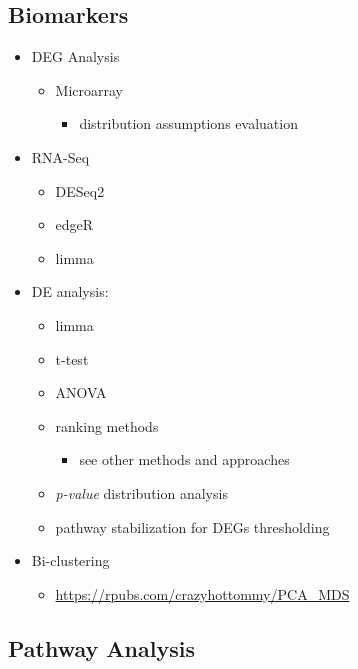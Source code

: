 \documentclass[
]{book}
\providecommand{\tightlist}{%
  \setlength{\itemsep}{0pt}\setlength{\parskip}{0pt}}
\begin{document}
\hypertarget{biomarkers}{%
\subsection{Biomarkers}\label{biomarkers}}

\begin{itemize}
\item
  DEG Analysis

  \begin{itemize}
  \item
    Microarray

    \begin{itemize}
    \tightlist
    \item
      distribution assumptions evaluation
    \end{itemize}
  \end{itemize}
\item
  RNA-Seq

  \begin{itemize}
  \item
    DESeq2
  \item
    edgeR
  \item
    limma
  \end{itemize}
\item
  DE analysis:

  \begin{itemize}
  \item
    limma
  \item
    t-test
  \item
    ANOVA
  \item
    ranking methods

    \begin{itemize}
    \tightlist
    \item
      see other methods and approaches
    \end{itemize}
  \item
    \emph{p-value} distribution analysis
  \item
    pathway stabilization for DEGs thresholding
  \end{itemize}
\item
  Bi-clustering

  \begin{itemize}
  \tightlist
  \item
    \url{https://rpubs.com/crazyhottommy/PCA_MDS}
  \end{itemize}
\end{itemize}

\hypertarget{pathway-analysis}{%
\subsection{Pathway Analysis}\label{pathway-analysis}}
\end{document}
